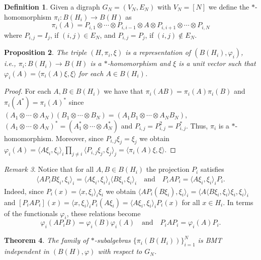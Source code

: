\documentclass[a4paper,12pt]{extarticle}
\newtheorem{thm}{Theorem}[section]
\newtheorem{prop}[thm]{Proposition}
\theoremstyle{definition}
\newtheorem{defn}[thm]{Definition}
\theoremstyle{remark}
\newtheorem{rem}[thm]{Remark}
\begin{document}
\begin{defn}
	Given a digraph $G_N=(V_N,E_N)$ with $V_N=[N]$ we define the $\ast$-homomorphism $\pi_i:B(H_i)\to B(H)$ as 
	\[ 
	\pi_i(A)=P_{i,1}\otimes \cdots \otimes P_{i, i-1}\otimes A \otimes P_{i,i+1}\otimes \cdots \otimes P_{i,N}	
	\]
	where $P_{i,j}=I_j$, if $(i,j)\in E_N$, and $P_{i,j}=P_j$, if $(i,j)\notin E_N$.
\end{defn}

\begin{prop}\label{representation_pi}
	The triple $(H,\pi_i,\xi)$ is a representation of $(B(H_i),\varphi_i)$, i.e., $\pi_i: B(H_i)\to B(H)$ is a $\ast$-homomorphism and $\xi$ is a unit vector such that $\varphi_i(A)=\langle \pi_i(A)\xi,\xi\rangle$ for each $A\in B(H_i)$.
\end{prop}
\begin{proof}
	For each $A,B \in B(H_i)$ we have that $\pi_i(AB)=\pi_i(A)\pi_i(B)$ and $\pi_i(A^*)=\pi_i(A)^*$ since 
	$(A_1\otimes \cdots \otimes A_N)(B_1\otimes \cdots \otimes B_N)=(A_1B_1\otimes \cdots \otimes A_NB_N)$, $(A_1\otimes \cdots \otimes A_N)^*=(A_1^*\otimes \cdots \otimes A_N^*)$ and $P_{i,j}=P_{i,j}^2=P_{i,j}^*$. 
	Thus, $\pi_i$ is a $*$-homomorphism. 
	Moreover, since $P_{i,j}\xi_j=\xi_j$ we obtain $\varphi_i(A)=\langle A\xi_i,\xi_i\rangle_i\prod_{j\neq i} \langle P_{i,j}\xi_j,\xi_j \rangle_j=\langle \pi_i(A)\xi,\xi\rangle$.%
\end{proof}

\begin{rem}\label{marginalsandhomomorphism}
	Notice that for all $A,B\in B(H_i)$ the projection $P_i$ satisfies
	\begin{align*}
		\langle AP_iB\xi_i, \xi_i \rangle_i=\langle A\xi_i,\xi_i \rangle_i\langle B\xi_i,\xi_i \rangle_i
		\quad \text{and} \quad 
		P_i A P_i=\langle A \xi_i,\xi_i \rangle_i P_i . 
	\end{align*}
	Indeed, since $P_i(x)=\langle x,\xi_i \rangle_i \xi_i$ 
	we obtain $\langle AP_i ( B\xi_i) ,\xi_i\rangle_i = \langle A \langle B\xi_i,\xi_i \rangle \xi_i,\xi_i\rangle_i$ and $[P_i A P_i](x)=\langle x,\xi_i\rangle_i P_i (A\xi_i)=\langle A\xi_i, \xi_i \rangle_i P_i(x)$ for all $x\in H_i$. 
	In terms of the functionals $\varphi_i$, these relations become
	\[
	\varphi_i(AP_iB)=\varphi_i(B)\varphi_i(A)\quad \text{and} \quad P_iAP_i=\varphi_i(A)P_i .
	\] 
\end{rem}


\begin{thm}\label{thm:bmt_operators}
	The family of $\ast$-subalgebras $\{\pi_i(B(H_i))\}_{i=1}^N$ is BMT independent in $(B(H),\varphi)$ with respect to $G_N$.
\end{thm}
\end{document}

